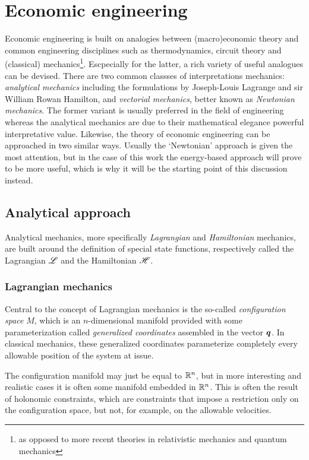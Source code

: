 \chapter{Economic engineering}
Economic engineering is built on analogies between (macro)economic theory and common engineering disciplines such as thermodynamics, circuit theory and (classical) mechanics\footnote{as opposed to more recent theories in relativistic mechanics and quantum mechanics}. Escpecially for the latter, a rich variety of useful analogues can be devised. There are two common classses of interpretations mechanics: \emph{analytical mechanics} including the formulations by Joseph-Louis Lagrange and sir William Rowan Hamilton, and \emph{vectorial mechanics}, better known as \emph{Newtonian mechanics}. The former variant is usually preferred in the field of engineering whereas the analytical mechanics are due to their mathematical elegance powerful interpretative value. Likewise, the theory of economic engineering can be approached in two similar ways. Usually the `Newtonian' approach is given the most attention, but in the case of this work the energy-based approach will prove to be more useful, which is why it will be the starting point of this discussion instead.

\section{Analytical approach}
Analytical mechanics, more specifically \emph{Lagrangian} and \emph{Hamiltonian} mechanics, are built around the definition of special state functions, respectively called the Lagrangian \(\mathscr{L}\) and the Hamiltonian \(\mathscr{H}\).

\subsection{Lagrangian mechanics}
Central to the concept of Lagrangian mechanics is the so-called \emph{configuration space} \(M\), which is an \(n\)-dimensional manifold provided with some parameterization called \emph{generalized coordinates} assembled in the vector \(\vb*{q}\). In classical mechanics, these generalized coordinates parameterize completely every allowable position of the system at issue. 

The configuration manifold may just be equal to \(\mathbb{R}^n\), but in more interesting and realistic cases it is often some manifold embedded in \(\mathbb{R}^n\). This is often the result of holonomic constraints, which are constraints that impose a restriction only on the configuration space, but not, for example, on the allowable velocities.

